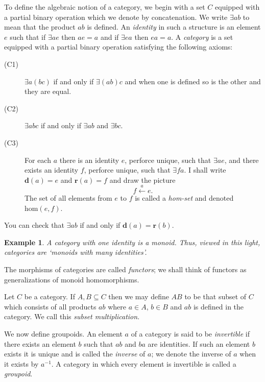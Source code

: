 \documentclass[a4paper]{amsart}
\newtheorem{example}[theorem]{Example}
\begin{document}
To define the algebraic notion of a category, we begin with a set $C$ equipped with a partial binary operation which we denote by concatenation.
We write $\exists ab$ to mean that the product $ab$ is defined.
An {\em identity} in such a structure is an element $e$ such that if $\exists ae$ then $ae = a$ and if $\exists ea$ then $ea = a$.
A {\em category} is a set equipped with a partial binary operation satisfying the following axioms:
\begin{description}
\item[{\rm (C1)}] $\exists a(bc)$ if and only if $\exists (ab)c$ and when one is defined so is the other and they are equal.
\item[{\rm (C2)}] $\exists abc$ if and only if $\exists ab$ and $\exists bc$.
\item[{\rm (C3)}] For each $a$ there is an identity $e$, perforce unique, such that $\exists ae$,
and there exists an identity $f$, perforce unique, such that $\exists fa$.
I shall write $\mathbf{d}(a) = e$ and $\mathbf{r}(a) = f$ and draw the picture
$$f \stackrel{a}{\longleftarrow} e.$$
The set of all elements from $e$ to $f$ is called a {\em hom-set} and denoted $\mbox{hom}(e,f)$.
\end{description}
You can check that $\exists ab$ if and only if $\mathbf{d}(a) = \mathbf{r}(b)$.

\begin{example}{\em A category with one identity is a monoid.
Thus, viewed in this light, categories are `monoids with many identities'.}
\end{example}

The morphisms of categories are called {\em functors}; we shall think of functors as generalizations of monoid homomorphisms.

Let $C$ be a category.
If $A,B \subseteq C$ then we may define $AB$ to be that subset of $C$
which consists of all products $ab$ where $a \in A$, $b \in B$ and $ab$ is defined in the category.
We call this {\em subset multiplication}. 

We now define groupoids.
An element $a$ of a category is said to be {\em invertible} if there exists an element $b$ such that $ab$ and $ba$ are identities.
If such an element $b$ exists it is unique and is called the {\em inverse} of $a$;
we denote the inverse of $a$ when it exists by $a^{-1}$.
A category in which every element is invertible is called a {\em groupoid}.
\end{document}
